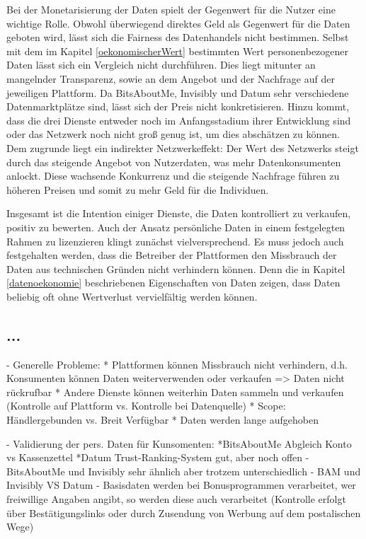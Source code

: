 \noindent Bei der Monetarisierung der Daten spielt der Gegenwert für die Nutzer eine wichtige Rolle. Obwohl überwiegend direktes Geld als Gegenwert für die Daten geboten wird, lässt sich die Fairness des Datenhandels nicht bestimmen. Selbst mit dem im Kapitel \ref{oekonomischerWert} bestimmten Wert personenbezogener Daten lässt sich ein Vergleich nicht durchführen. Dies liegt mitunter an mangelnder Transparenz, sowie an dem Angebot und der Nachfrage auf der jeweiligen Plattform. Da BitsAboutMe, Invisibly und Datum sehr verschiedene Datenmarktplätze sind, lässt sich der Preis nicht konkretisieren. Hinzu kommt, dass die drei Dienste entweder noch im Anfangsstadium ihrer Entwicklung sind oder das Netzwerk noch nicht groß genug ist, um dies abschätzen zu können. Dem zugrunde liegt ein indirekter Netzwerkeffekt: Der Wert des Netzwerks steigt durch das steigende Angebot von Nutzerdaten, was mehr Datenkonsumenten anlockt. Diese wachsende Konkurrenz und die steigende Nachfrage führen zu höheren Preisen und somit zu mehr Geld für die Individuen. \newline

\noindent Insgesamt ist die Intention einiger Dienste, die Daten kontrolliert zu verkaufen, positiv zu bewerten. Auch der Ansatz persönliche Daten in einem festgelegten Rahmen zu lizenzieren klingt zunächst vielversprechend. Es muss jedoch auch festgehalten werden, dass die Betreiber der Plattformen den Missbrauch der Daten aus technischen Gründen nicht verhindern können. Denn die in Kapitel \ref{datenoekonomie} beschriebenen Eigenschaften von Daten zeigen, dass Daten beliebig oft ohne Wertverlust vervielfältig werden können.


\subsection{...}

- Generelle Probleme:
    * Plattformen können Missbrauch nicht verhindern, d.h. Konsumenten können Daten weiterverwenden oder verkaufen => Daten nicht rückrufbar
    * Andere Dienste können weiterhin Daten sammeln und verkaufen (Kontrolle auf Plattform vs. Kontrolle bei Datenquelle)
    * Scope: Händlergebunden vs. Breit Verfügbar
    * Daten werden lange aufgehoben


- Validierung der pers. Daten für Kunsomenten: 
    *BitsAboutMe Abgleich Konto vs Kassenzettel
    *Datum Trust-Ranking-System gut, aber noch offen
- BitsAboutMe und Invisibly sehr ähnlich aber trotzem unterschiedlich
- BAM und Invisibly VS Datum
- Basisdaten werden bei Bonusprogrammen verarbeitet, wer freiwillige Angaben angibt, so werden diese auch verarbeitet (Kontrolle erfolgt über Bestätigungslinks oder durch Zusendung von Werbung auf dem postalischen Wege)


